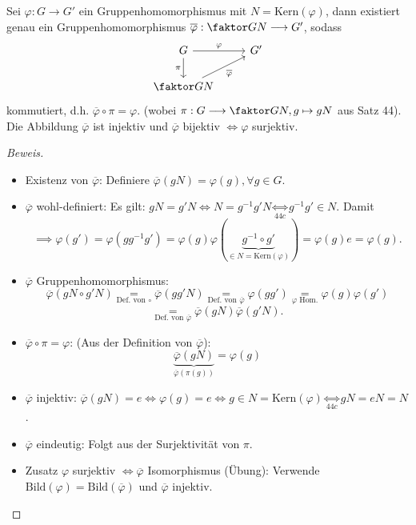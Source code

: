 \documentclass[a4paper]{report}
\begin{document}
\begin{satz}
  Sei $\varphi: G \to G'$ ein Gruppenhomomorphismus mit $N = \mathrm{Kern}(\varphi)$, dann existiert genau ein Gruppenhomomorphismus $\overline \varphi : \faktor GN \longrightarrow G'$, sodass
  $$
\begin{tikzcd}
G \arrow[r, "\varphi"] \arrow[d, "\pi"'] & G' \\
\faktor GN \arrow[ru, "\overline \varphi"']               &
\end{tikzcd}
$$
kommutiert, d.h. $\overline \varphi \circ \pi = \varphi$. (wobei $\pi : G \longrightarrow \faktor GN, g \mapsto gN$ aus Satz 44). Die Abbildung $\overline \varphi$ ist injektiv und $\overline \varphi$ bijektiv $\iff \varphi$ surjektiv.
\begin{proof}[Beweis]
\begin{itemize}
  \item Existenz von $\overline \varphi$: Definiere $\overline\varphi(gN) = \varphi(g), \forall g \in G$.
  \item $\overline\varphi$ wohl-definiert: Es gilt: $gN = g'N \iff N = g^{-1}g'N \underset{44c}\iff g^{-1}g' \in N.$ Damit $$\implies \varphi(g') = \varphi(gg^{-1}g') = \varphi(g)\varphi(\underbrace{g^{-1} \circ g'}_{\in N = \mathrm{Kern}(\varphi)}) = \varphi(g)e = \varphi(g).$$
  \item $\overline\varphi$ Gruppenhomomorphismus: $$\overline\varphi(gN \circ g'N)\underset{\text{Def. von } \circ} = \overline\varphi(gg'N) \underset{\text{Def. von } \overline\varphi} =  \varphi(gg') \underset{\varphi \text{ Hom.}} = \varphi(g)\varphi(g')$$
        $$\underset{\text{Def. von } \overline\varphi} =\overline\varphi(gN)\overline\varphi(g'N).$$
\item $\overline\varphi \circ \pi = \varphi$: (Aus der Definition von $\overline\varphi$): $$\underbrace{\overline\varphi(gN)}_{\overline\varphi(\pi(g))} = \varphi(g)$$
\item $\overline\varphi$ injektiv: $\overline\varphi(gN) = e \iff \varphi(g)=e \iff g \in N = \mathrm{Kern}(\varphi) \underset{44c} \iff gN= eN = N$.
\item $\overline\varphi$ eindeutig: Folgt aus der Surjektivität von $\pi$.
\item Zusatz $\varphi$ surjektiv $\iff \overline\varphi$ Isomorphismus (Übung): Verwende $\mathrm{Bild}(\varphi) = \mathrm{Bild}(\overline\varphi)$ und $\overline\varphi$ injektiv.
\end{itemize}
\end{proof}
\end{satz}
\end{document}
